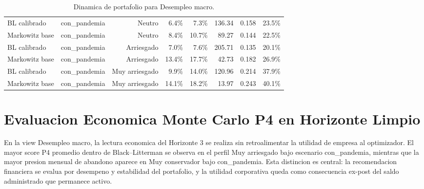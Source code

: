 \documentclass[11pt]{article}
\begin{document}
\begin{table}[H]
{\begin{tabular}{lrrrrrrr}
BL calibrado & con\_pandemia & Neutro & 6.4\% & 7.3\% & 136.34 & 0.158 & 23.5\% \\
Markowitz base & con\_pandemia & Neutro & 8.4\% & 10.7\% & 89.27 & 0.144 & 22.5\% \\
BL calibrado & con\_pandemia & Arriesgado & 7.0\% & 7.6\% & 205.71 & 0.135 & 20.1\% \\
Markowitz base & con\_pandemia & Arriesgado & 13.4\% & 17.7\% & 42.73 & 0.182 & 26.9\% \\
BL calibrado & con\_pandemia & Muy arriesgado & 9.9\% & 14.0\% & 120.96 & 0.214 & 37.9\% \\
Markowitz base & con\_pandemia & Muy arriesgado & 14.1\% & 18.2\% & 13.97 & 0.243 & 40.1\% \\
\bottomrule
\end{tabular}
}
\caption{Dinamica de portafolio para Desempleo macro.}
\label{tab:dinamica_desempleo_macro_v1_plus}
\end{table}


\section{Evaluacion Economica Monte Carlo P4 en Horizonte Limpio}

En la view Desempleo macro, la lectura economica del Horizonte 3 se realiza sin retroalimentar la utilidad de empresa al optimizador. El mayor score P4 promedio dentro de Black--Litterman se observa en el perfil Muy arriesgado bajo escenario con\_pandemia, mientras que la mayor presion mensual de abandono aparece en Muy conservador bajo con\_pandemia. Esta distincion es central: la recomendacion financiera se evalua por desempeno y estabilidad del portafolio, y la utilidad corporativa queda como consecuencia ex-post del saldo administrado que permanece activo.
\end{document}

